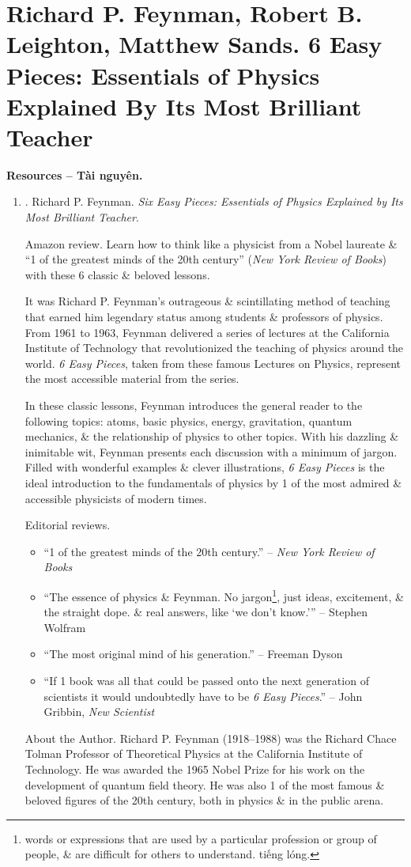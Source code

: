 \documentclass{article}
\begin{document}
\section{{\sc Richard P. Feynman, Robert B. Leighton, Matthew Sands}. 6 Easy Pieces: Essentials of Physics Explained By Its Most Brilliant Teacher}
\textbf{\textsf{Resources -- Tài nguyên.}}
\begin{enumerate}
	\item \cite{Feyman_Leighton_Sands_6_easy_pieces}. {\sc Richard P. Feynman}. {\it Six Easy Pieces: Essentials of Physics Explained by Its Most Brilliant Teacher}. {}
	
	{\sf Amazon review.} Learn how to think like a physicist from a Nobel laureate \& ``1 of the greatest minds of the 20th century'' ({\it New York Review of Books}) with these 6 classic \& beloved lessons.
	
	It was {\sc Richard P. Feynman}'s outrageous \& scintillating method of teaching that earned him legendary status among students \& professors of physics. From 1961 to 1963, {\sc Feynman} delivered a series of lectures at the California Institute of Technology that revolutionized the teaching of physics around the world. {\it6 Easy Pieces}, taken from these famous Lectures on Physics, represent the most accessible material from the series.
	
	In these classic lessons, {\sc Feynman} introduces the general reader to the following topics: atoms, basic physics, energy, gravitation, quantum mechanics, \& the relationship of physics to other topics. With his dazzling \& inimitable wit, {\sc Feynman} presents each discussion with a minimum of jargon. Filled with wonderful examples \& clever illustrations, {\it6 Easy Pieces} is the ideal introduction to the fundamentals of physics by 1 of the most admired \& accessible physicists of modern times.
	
	{\sf Editorial reviews.}
	\begin{itemize}
		\item ``1 of the greatest minds of the 20th century.'' -- {\it New York Review of Books}
		\item ``The essence of physics \& {\sc Feynman}. No jargon\footnote{words or expressions that are used by a particular profession or group of people, \& are difficult for others to understand. tiếng lóng.}, just ideas, excitement, \& the straight dope. \& real answers, like `we don't know.''' -- {\sc Stephen Wolfram}
		\item ``The most original mind of his generation.'' -- {\sc Freeman Dyson}
		\item ``If 1 book was all that could be passed onto the next generation of scientists it would undoubtedly have to be {\it6 Easy Pieces}.'' -- {\sc John Gribbin}, {\it New Scientist}
	\end{itemize}
	{\sf About the Author.} {\sc Richard P. Feynman} (1918--1988) was the Richard Chace Tolman Professor of Theoretical Physics at the California Institute of Technology. He was awarded the 1965 Nobel Prize for his work on the development of quantum field theory. He was also 1 of the most famous \& beloved figures of the 20th century, both in physics \& in the public arena.
\end{enumerate}
\end{document}

